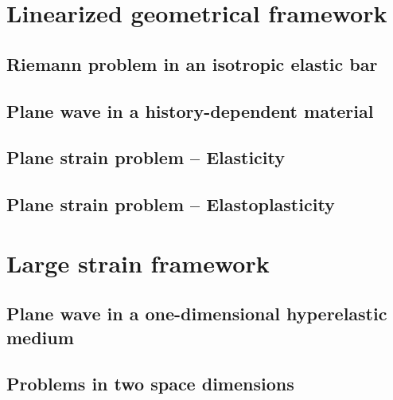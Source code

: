 \section{Linearized geometrical framework}
\label{sec:hpp_simulations}

\subsection{Riemann problem in an isotropic elastic bar}
\label{subsec:hpp_bar}


\subsection{Plane wave in a history-dependent material}
\label{subsec:hpp_planewave}


\subsection{Plane strain problem -- Elasticity}
\label{subsec:el_planestrain}


\subsection{Plane strain problem -- Elastoplasticity}
\label{subsec:ep_planestrain}


\section{Large strain framework}
\label{sec:he_simulations}
\subsection{Plane wave in a one-dimensional hyperelastic medium}
\label{subsec:he_planewave}



\subsection{Problems in two space dimensions}
\label{subsec:he_plate}






